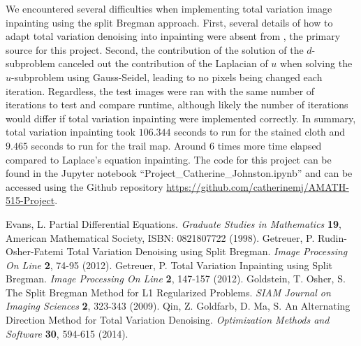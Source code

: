 \documentclass[11pt,reqno,twoside]{amsart}
\theoremstyle{plain}
\theoremstyle{definition}
\numberwithin{figure}{section}
\numberwithin{equation}{section}
\begin{document}
\newpage

We encountered several difficulties when implementing total variation image inpainting using the split Bregman approach.  First, several details of how to adapt total variation denoising into inpainting were absent from \cite{ge2012}, the primary source for this project.  Second, the contribution of the solution of the $d$-subproblem canceled out the contribution of the Laplacian of $u$ when solving the $u$-subproblem using Gauss-Seidel, leading to no pixels being changed each iteration.  Regardless, the test images were ran with the same number of iterations to test and compare runtime, although likely the number of iterations would differ if total variation inpainting were implemented correctly.  In summary, total variation inpainting took $106.344$ seconds to run for the stained cloth and $9.465$ seconds to run for the trail map.  Around 6 times more time elapsed compared to Laplace's equation inpainting.  The code for this project can be found in the Jupyter notebook ``Project\_Catherine\_Johnston.ipynb'' and can be accessed using the Github repository \url{https://github.com/catherinemj/AMATH-515-Project}.

\newpage

\begin{thebibliography}{1000000}
%
 Evans, L. Partial Differential Equations. \textit{Graduate Studies in Mathematics} \textbf{19}, American Mathematical Society, ISBN: 0821807722 (1998).
%
 Getreuer, P. Rudin-Osher-Fatemi Total Variation Denoising using Split Bregman. \textit{Image Processing On Line} \textbf{2}, 74-95 (2012).
%
 Getreuer, P. Total Variation Inpainting using Split Bregman. \textit{Image Processing On Line} \textbf{2}, 147-157 (2012).
%
 Goldstein, T. Osher, S. The Split Bregman Method for L1 Regularized Problems. \textit{SIAM Journal on Imaging Sciences} \textbf{2}, 323-343 (2009).
%
 Qin, Z. Goldfarb, D. Ma, S. An Alternating Direction Method for Total Variation Denoising. \textit{Optimization Methods and Software} \textbf{30}, 594-615 (2014).
%
\end{thebibliography}
\end{document}
